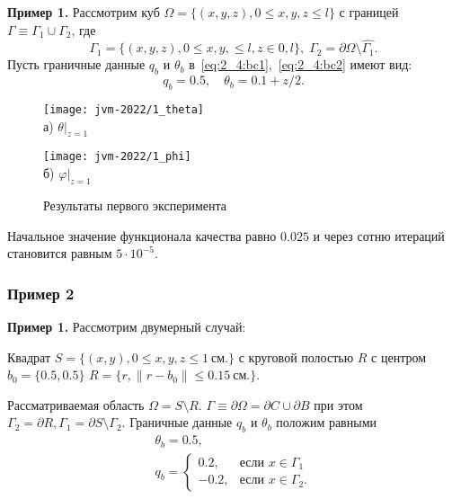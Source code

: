 \begin{frame}
    \textbf{Пример 1.}
    Рассмотрим куб $\Omega = \{ (x, y, z), 0 \leq x,y,z \leq l \}$ с границей
    $\Gamma \equiv \Gamma_1 \cup \Gamma_2$, где
    \[
        \Gamma_1 = \{(x, y, z), 0 \leq x,y, \leq l, z \in 0, l\}, \;
        \Gamma_2 = \partial \Omega \setminus \hat{\Gamma_1}.
    \]
    Пусть граничные данные $q_b$ и $\theta_b$ в~\eqref{eq:2_4:bc1},~\eqref{eq:2_4:bc2} имеют вид:
    \[ q_b = 0.5, \quad \theta_b = 0.1 + z/2. \]

    \begin{figure}[h!t]
        \begin{minipage}[b][][b]{0.39\linewidth}
            \centering
            \texttt{[image: jvm-2022/1\_theta]}
            \\ а) $\theta|_{z=1}$
        \end{minipage}
        \hfill
        \begin{minipage}[b][][b]{0.39\linewidth}
            \centering
            \texttt{[image: jvm-2022/1\_phi]}
            \\ б) $\varphi|_{z=1}$
        \end{minipage}
        \caption{Результаты первого эксперимента}
        \label{fig:4_4:5}
    \end{figure}


    Начальное значение функционала качества равно $0.025$ и
    через сотню итераций становится равным $5\cdot 10^{-5}$.
\end{frame}

\begin{frame}
    \frametitle{Пример 2}
    \textbf{Пример 1.}
    Рассмотрим двумерный случай:

    Квадрат $S = \{(x, y), 0 \leq x,y,z \leq 1~\text{см.}\}$ с
    круговой полостью $R$ с центром $b_0 =\{0.5, 0.5\}$
    $R = \{r, \| r - b_0 \| \leq 0.15~\text{см.} \}$.

    Рассматриваемая область $\Omega = S \setminus R$.
    $\Gamma \equiv \partial \Omega = \partial C \cup \partial B$ при этом
    $ \Gamma_2 = \partial R, \Gamma_1 = \partial S \setminus \Gamma_2$.
    Граничные данные $q_b$ и $\theta_b$ положим равными
    \begin{gather*}
        \theta_b = 0.5, \\
        q_b =
        \begin{cases}
            0.2, & \text{если } x \in \Gamma_1 \\
            -0.2, & \text{если } x \in \Gamma_2.
        \end{cases}
    \end{gather*}


\end{frame}

